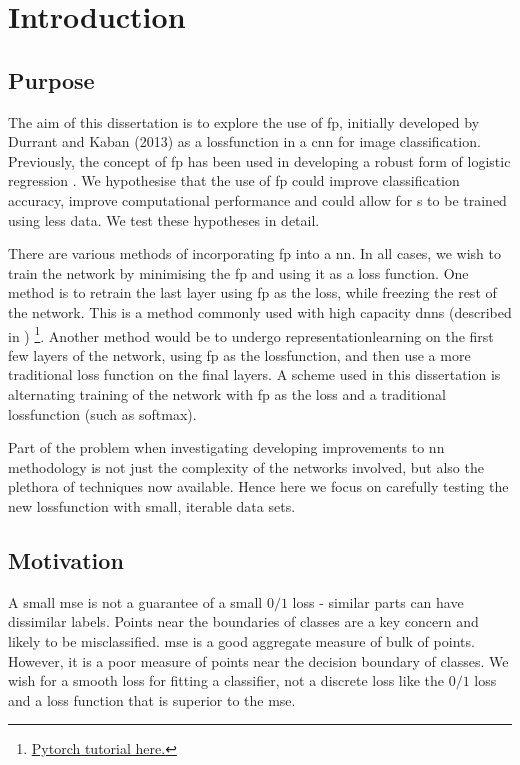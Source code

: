\chapter{Introduction}

\section{Purpose}

The aim of this dissertation is to explore the use of  \gls{fp}, initially developed by Durrant and Kaban (2013)\cite{durrant2013sharp} as a \gls{lossfunction} in a \gls{cnn} for image classification. Previously, the concept of  \gls{fp} has been used in developing a robust form of logistic regression \cite{label_noise}. We hypothesise that the use of  \gls{fp} could improve classification accuracy, improve computational performance and could allow for s to be trained using less data. We test these hypotheses in detail. 
\bigskip

There are various methods of incorporating  \gls{fp} into a  \gls{nn}. In all cases, we wish to train the network by minimising the \gls{fp} and using it as a loss function. One method is to retrain the last layer using  \gls{fp} as the loss, while freezing the rest of the network. This is a method commonly used with high capacity \gls{dnn}s (described in \cite{transfer_learning}) \footnote{\href{https://pytorch.org/tutorials/beginner/transfer_learning_tutorial.html}{Pytorch tutorial here.}}. Another method would be to undergo \gls{representationlearning} on the first few \gls{layer}s of the network, using \gls{fp} as the \gls{lossfunction}, and then use a more traditional loss function on the final layers. A scheme used in this dissertation is alternating training of the network with  \gls{fp} as the \gls{loss} and a traditional \gls{lossfunction} (such as \gls{softmax}). 
\bigskip

Part of the problem when investigating developing improvements to \gls{nn} methodology is not just the complexity of the networks involved, but also the plethora of techniques now available. Hence here we focus on carefully testing the new \gls{lossfunction} with small, iterable data sets.
\bigskip

\section{Motivation}

A small  \gls{mse} is not a guarantee of a small $0/1$ loss - similar parts can have dissimilar labels. Points near the boundaries of classes are a key concern and likely to be misclassified.  \gls{mse} is a good aggregate measure of bulk of points. However, it is a poor measure of points near the decision boundary of classes. We wish for a smooth loss for fitting a classifier, not a discrete loss like the $0/1$ loss and a loss function that is superior to the  \gls{mse}.
\bigskip

